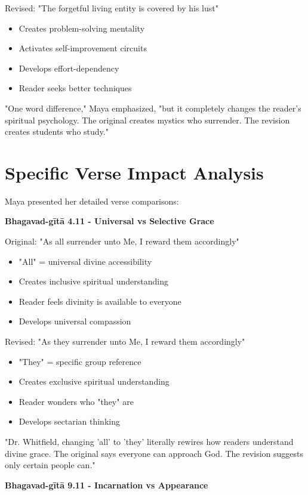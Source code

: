 \documentclass[11pt,twoside]{book}
\begin{document}
Revised: "The forgetful living entity is covered by his lust"
\begin{itemize}
\item Creates problem-solving mentality
\item Activates self-improvement circuits
\item Develops effort-dependency
\item Reader seeks better techniques
\end{itemize}

"One word difference," Maya emphasized, "but it completely changes the reader's spiritual psychology. The original creates mystics who surrender. The revision creates students who study."
\section*{Specific Verse Impact Analysis}
\label{sec:orgb11002b}

Maya presented her detailed verse comparisons:

\textbf{\textbf{Bhagavad-gītā 4.11 - Universal vs Selective Grace}}

Original: "As all surrender unto Me, I reward them accordingly"
\begin{itemize}
\item "All" = universal divine accessibility
\item Creates inclusive spiritual understanding
\item Reader feels divinity is available to everyone
\item Develops universal compassion
\end{itemize}

Revised: "As they surrender unto Me, I reward them accordingly"
\begin{itemize}
\item "They" = specific group reference
\item Creates exclusive spiritual understanding
\item Reader wonders who "they" are
\item Develops sectarian thinking
\end{itemize}

"Dr. Whitfield, changing 'all' to 'they' literally rewires how readers understand divine grace. The original says everyone can approach God. The revision suggests only certain people can."

\textbf{\textbf{Bhagavad-gītā 9.11 - Incarnation vs Appearance}}
\end{document}
